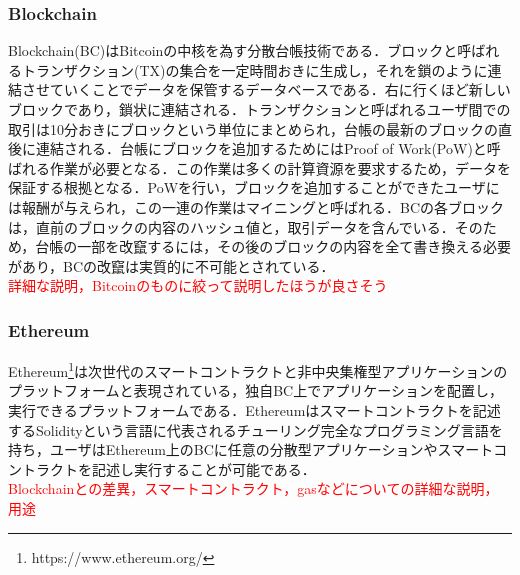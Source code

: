 \documentclass{kuisthesis}			%
\begin{document}
\subsubsection{Blockchain}
Blockchain(BC)はBitcoin\cite{nakamoto2008bitcoin}の中核を為す分散台帳技術である．ブロックと呼ばれるトランザクション(TX)の集合を一定時間おきに生成し，それを鎖のように連結させていくことでデータを保管するデータベースである．右に行くほど新しいブロックであり，鎖状に連結される．トランザクションと呼ばれるユーザ間での取引は10分おきにブロックという単位にまとめられ，台帳の最新のブロックの直後に連結される．台帳にブロックを追加するためにはProof of Work(PoW)と呼ばれる作業が必要となる．この作業は多くの計算資源を要求するため，データを保証する根拠となる．PoWを行い，ブロックを追加することができたユーザには報酬が与えられ，この一連の作業はマイニングと呼ばれる．BCの各ブロックは，直前のブロックの内容のハッシュ値と，取引データを含んでいる．そのため，台帳の一部を改竄するには，その後のブロックの内容を全て書き換える必要があり，BCの改竄は実質的に不可能とされている．\\
\textcolor{red}{詳細な説明，Bitcoinのものに絞って説明したほうが良さそう}


\subsubsection{Ethereum}
Ethereum\footnote{https://www.ethereum.org/}は次世代のスマートコントラクトと非中央集権型アプリケーションのプラットフォームと表現されている，独自BC上でアプリケーションを配置し，実行できるプラットフォームである．Ethereumはスマートコントラクトを記述するSolidityという言語に代表されるチューリング完全なプログラミング言語を持ち，ユーザはEthereum上のBCに任意の分散型アプリケーションやスマートコントラクトを記述し実行することが可能である．\\
\textcolor{red}{Blockchainとの差異，スマートコントラクト，gasなどについての詳細な説明，用途}\\
\end{document}
